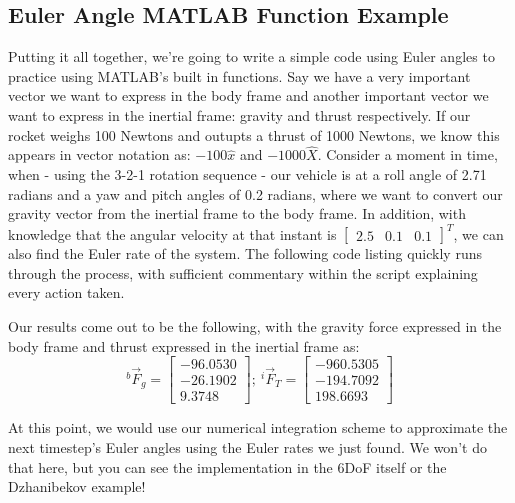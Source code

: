 \documentclass[12pt]{report}
\begin{document}
\subsection{Euler Angle MATLAB Function Example}\label{sec:EulerDynamicsMATLABExample}

Putting it all together, we're going to write a simple code using Euler angles to practice using MATLAB's built in functions. Say we have a very important vector we want to express in the body frame and another important vector we want to express in the inertial frame: gravity and thrust respectively. If our rocket weighs 100 Newtons and outupts a thrust of 1000 Newtons, we know this appears in vector notation as: $-100\hat{x}$ and $-1000\hat{X}$. Consider a moment in time, when - using the 3-2-1 rotation sequence - our vehicle is at a roll angle of 2.71 radians and a yaw and pitch angles of 0.2 radians, where we want to convert our gravity vector from the inertial frame to the body frame. In addition, with knowledge that the angular velocity at that instant is $\begin{bmatrix}
    2.5&0.1&0.1
\end{bmatrix}^T$, we can also find the Euler rate of the system. The following code listing quickly runs through the process, with sufficient commentary within the script explaining every action taken.

\lstset{style=mystyle}

\label{Euler Dynamics Listing}

Our results come out to be the following, with the gravity force expressed in the body frame and thrust expressed in the inertial frame as:
\begin{equation}
    ^b\vec{F}_{g}=\begin{bmatrix}
        -96.0530\\-26.1902\\9.3748
    \end{bmatrix};\ ^i\vec{F}_{T}=\begin{bmatrix}
        -960.5305\\-194.7092\\198.6693
    \end{bmatrix}
\end{equation}

At this point, we would use our numerical integration scheme to approximate the next timestep's Euler angles using the Euler rates we just found. We won't do that here, but you can see the implementation in the 6DoF itself or the Dzhanibekov example!
\end{document}
